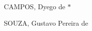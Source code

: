 
\begin{DoxyRefList}
\item[\label{todo__todo000001}%
\hypertarget{todo__todo000001}{}%
page \hyperlink{index}{Carro Solar} ]\begin{DoxyItemize}
\item C\+A\+M\+P\+O\+S, Dyego de $\ast$ \item S\+O\+U\+Z\+A, Gustavo Pereira de\end{DoxyItemize}

\end{DoxyRefList}